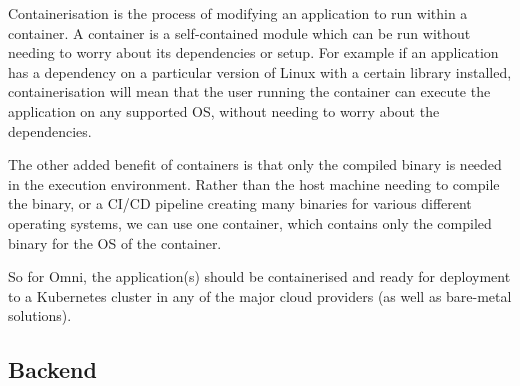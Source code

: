 Containerisation is the process of modifying an application to run within a container. A container is a self-contained module which can be run without needing to worry about its dependencies or setup. For example if an application has a dependency on a particular version of Linux with a certain library installed, containerisation will mean that the user running the container can execute the application on any supported OS, without needing to worry about the dependencies.

The other added benefit of containers is that only the compiled binary is needed in the execution environment. Rather than the host machine needing to compile the binary, or a CI/CD pipeline creating many binaries for various different operating systems, we can use one container, which contains only the compiled binary for the OS of the container.

So for Omni, the application(s) should be containerised and ready for deployment to a Kubernetes cluster in any of the major cloud providers (as well as bare-metal solutions).

\subsection{Backend}
\label{sec:design-system-backend}

